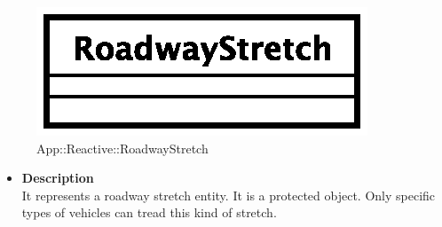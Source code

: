 \begin{figure}[h]
\centering
\includegraphics[scale=0.6,keepaspectratio]{images/solution/roadway_stretch.eps}
\caption{App::Reactive::RoadwayStretch}
\label{fig:sd-app-roadway_stretch}
\end{figure}
\FloatBarrier
\begin{itemize}
  \item \textbf{Description} \\
    It represents a roadway stretch entity. It is a protected object. Only specific types of vehicles can tread this kind of stretch.
\end{itemize}
